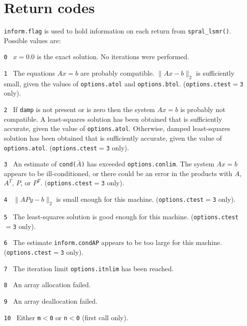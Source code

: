 
\section{Return codes} \label{LSMR:errors}

{\tt inform.flag} is used to hold
   information on each return from {\tt spral\_lsmr()}. 
Possible values are:
\begin{description}
\item{\tt 0 }  $x = 0.0$  is the exact solution.
               No iterations were performed.
\item{\tt 1 }  The equations $Ax = b$ are probably compatible.
               $\|Ax - b\|_2$ is sufficiently small, given the
               values of {\tt options.atol} and {\tt options.btol}. 
               ({\tt options.ctest}$ = ${\tt 3} only). 
\item{\tt 2 }  If {\tt damp} is not present or is zero then the system $Ax = b$
               is probably not compatible.  A least-squares solution has been
               obtained that is sufficiently accurate, given the value of
               {\tt options.atol}.  
               Otherwise, damped least-squares solution has been obtained that
               is sufficiently accurate, given the value of {\tt options.atol}.
               ({\tt options.ctest}$ = ${\tt 3} only). 
\item{\tt 3 }  An estimate of {\tt cond($\bar{A}$)} has exceeded
               {\tt options.conlim}. The system $Ax = b$ appears to be
               ill-conditioned, or there could be an error in the products 
               with $A$, $A^T$, $P$, or $P^T$. ({\tt options.ctest}$ = ${\tt 3}
               only). 
\item{\tt 4 }  $\|APy - b \|_2$ is small enough for this machine.
               ({\tt options.ctest}$ = ${\tt 3} only). 
\item{\tt 5 }  The least-squares solution is good enough for this
               machine. ({\tt options.ctest}$ = ${\tt 3} only). 
\item{\tt 6 }  The estimate {\tt inform.condAP} appears to be too large 
               for this machine.         
               ({\tt options.ctest}$ = ${\tt 3} only). 
\item{\tt 7 }  The iteration limit {\tt options.itnlim} has been reached. 
\item{\tt 8 }  An array allocation failed.
\item{\tt 9 }  An array deallocation failed.
\item{\tt 10 } Either  {\tt m$<$0} or {\tt n$<$0} (first call only).

\end{description}


